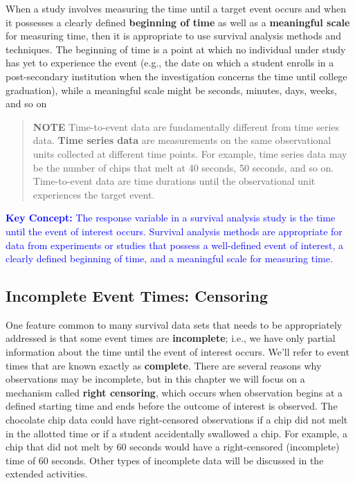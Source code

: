 \documentclass[
]{book}
\begin{document}
When a study involves measuring the time until a target event occurs and when it possesses a clearly
defined \textbf{beginning of time} as well as a \textbf{meaningful scale} for measuring time, then it is appropriate to use
survival analysis methods and techniques. The beginning of time is a point at which no individual under study
has yet to experience the event (e.g., the date on which a student enrolls in a post-secondary institution when
the investigation concerns the time until college graduation), while a meaningful scale might be seconds,
minutes, days, weeks, and so on

\begin{quote}
\textbf{NOTE}
Time-to-event data are fundamentally different from time series data. \textbf{Time series data} are measurements on the same observational units collected at different time points. For example, time series data may be the number of chips that melt at 40 seconds, 50 seconds, and so on. Time-to-event data are time durations until the observational unit experiences the target event.
\end{quote}

\textbf{\textcolor{blue}{Key Concept:}}
\textcolor{blue}{The response variable in a survival analysis study is the time until the event of interest occurs. Survival analysis methods are appropriate for data from experiments or studies that possess a well-defined event of interest, a clearly defined beginning of time, and a meaningful scale for measuring time.}

\hypertarget{incomplete-event-times-censoring}{%
\subsection*{Incomplete Event Times: Censoring}\label{incomplete-event-times-censoring}}

One feature common to many survival data sets that needs to be appropriately addressed is that some event times are \textbf{incomplete}; i.e., we have only partial information about the time until the event of interest occurs. We'll refer to event times that are known exactly as \textbf{complete}. There are several reasons why observations may be incomplete, but in this chapter we will focus on a mechanism called \textbf{right censoring}, which occurs when observation begins at a defined starting time and ends before the outcome of interest is observed. The chocolate chip data could have right-censored observations if a chip did not melt in the allotted time or if a student accidentally swallowed a chip. For example, a chip that did not melt by 60 seconds would have a right-censored (incomplete) time of 60 seconds. Other types of incomplete data will be discussed in the extended activities.
\end{document}
